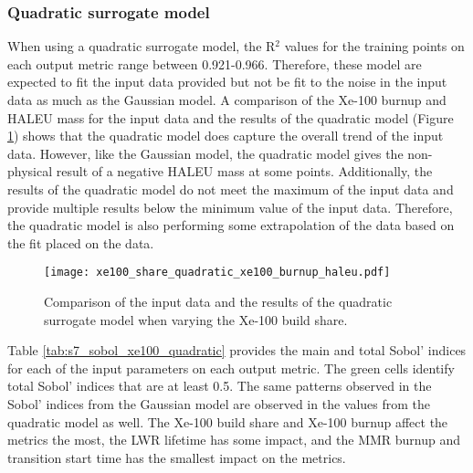 \subsubsection{Quadratic surrogate model}
When using a quadratic surrogate model, the R$^2$ values for the training points on 
each output metric range between 0.921-0.966. Therefore, these model are  
expected to 
fit the input data provided but not be fit to the noise in the input data 
as much as the Gaussian model. A comparison of the Xe-100 burnup and \gls{HALEU} 
mass for the input data and the results of the quadratic model (Figure 
\ref{fig:s7_xe100_quadratic}) shows that the quadratic model does 
capture the overall trend of the input data. However, like the Gaussian model, 
the quadratic model gives the non-physical result of a negative \gls{HALEU} mass
at some points. Additionally, 
the results of the quadratic model do not meet the maximum of the input data and 
provide multiple results below the minimum value of the input data. Therefore, 
the quadratic model is also performing some extrapolation of the data based on the 
fit placed on the data.

\begin{figure}[h!]
    \centering 
    \texttt{[image: xe100\_share\_quadratic\_xe100\_burnup\_haleu.pdf]}
    \caption{Comparison of the input data and the results of the quadratic 
    surrogate model when varying the Xe-100 build share.}
    \label{fig:s7_xe100_quadratic}
\end{figure}

Table \ref{tab:s7_sobol_xe100_quadratic} provides the main and total Sobol' 
indices for each of the input parameters on each output metric. The 
green cells identify total Sobol' indices that are at least 0.5. The same patterns 
observed in the Sobol' indices from the Gaussian model are 
observed in the values from the quadratic model as well. The Xe-100 build share 
and Xe-100 burnup affect the metrics the most, the \gls{LWR} lifetime has some 
impact, and the \gls{MMR} burnup and transition start time has the smallest impact 
on the metrics. 

